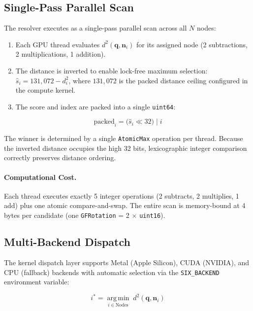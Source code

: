 \subsection{Single-Pass Parallel Scan}
\label{sec:single_pass}

The resolver executes as a single-pass parallel scan across all $N$ nodes:

\begin{enumerate}[nosep]
  \item Each GPU thread evaluates $d^2(\mathbf{q}, \mathbf{n}_i)$ for its
        assigned node (2 subtractions, 2 multiplications, 1 addition).
  \item The distance is inverted to enable lock-free maximum selection:
        $\hat{s}_i = 131{,}072 - d^2_i$, where $131{,}072$ is the packed
        distance ceiling configured in the compute kernel.
  \item The score and index are packed into a single \texttt{uint64}:
\end{enumerate}

\begin{equation}
  \text{packed}_i = \bigl(\hat{s}_i \ll 32\bigr) \;\big|\; i
  \label{eq:packed}
\end{equation}

The winner is determined by a single \texttt{AtomicMax} operation per thread.
Because the inverted distance occupies the high 32 bits, lexicographic
integer comparison correctly preserves distance ordering.

\paragraph{Computational Cost.}
Each thread executes exactly 5 integer operations (2 subtracts, 2 multiplies,
1 add) plus one atomic compare-and-swap.  The entire scan is memory-bound
at 4 bytes per candidate (one \texttt{GFRotation} = 2 $\times$
\texttt{uint16}).

\subsection{Multi-Backend Dispatch}
\label{sec:multi_backend}

The kernel dispatch layer supports Metal (Apple Silicon), CUDA (NVIDIA),
and CPU (fallback) backends with automatic selection via the
\texttt{SIX\_BACKEND} environment variable:

\begin{equation}
  i^* = \operatorname*{arg\,min}_{i \in \text{Nodes}}\;
        d^2(\mathbf{q}, \mathbf{n}_i)
  \label{eq:dispatch}
\end{equation}

